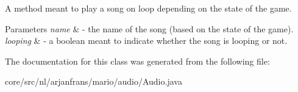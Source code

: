 A method meant to play a song on loop depending on the state of the game. 


\begin{DoxyParams}{Parameters}
{\em name} & -\/ the name of the song (based on the state of the game). \\
\hline
{\em looping} & -\/ a boolean meant to indicate whether the song is looping or not. \\
\hline
\end{DoxyParams}


The documentation for this class was generated from the following file\+:\begin{DoxyCompactItemize}
\item 
core/src/nl/arjanfrans/mario/audio/Audio.\+java\end{DoxyCompactItemize}
